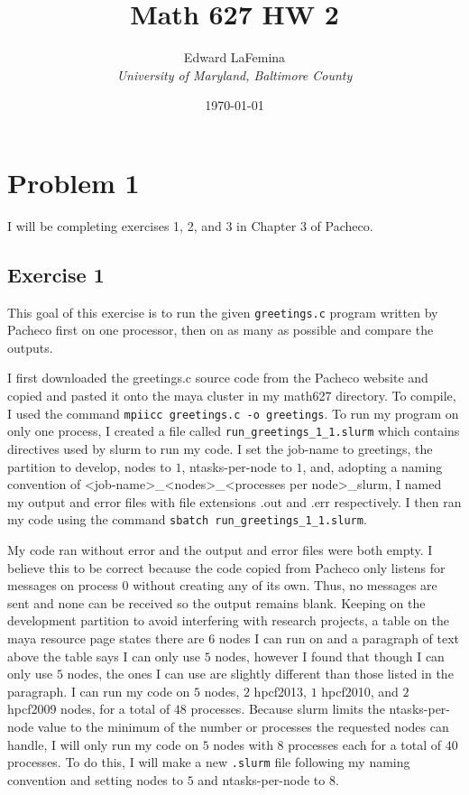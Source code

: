 \documentclass[11pt]{article}
\author{Edward LaFemina \\
		\it{University of Maryland, Baltimore County}}
\title{Math 627 HW 2}
\date{\today}
\begin{document}
\maketitle
\tableofcontents

\pagebreak
\section{Problem 1}
I will be completing exercises 1, 2, and 3 in Chapter 3 of Pacheco.
	\subsection{Exercise 1}
	This goal of this exercise is to run the given \texttt{greetings.c} program written by Pacheco first on one processor, then on as many as possible and compare the outputs.
	
	I first downloaded the greetings.c source code from the Pacheco website and copied and pasted it onto the maya cluster in my math627 directory. To compile, I used the command \texttt{mpiicc greetings.c -o greetings}. To run my program on only one process, I created a file called \texttt{run\_greetings\_1\_1.slurm} which contains directives used by slurm to run my code. I set the job-name to greetings, the partition to develop, nodes to $1$, ntasks-per-node to $1$, and, adopting a naming convention of \textless job-name\textgreater\_\textless nodes\textgreater\_\textless processes per node\textgreater\_slurm, I named my output and error files with file extensions .out and .err respectively. I then ran my code using the command \texttt{sbatch run\_greetings\_1\_1.slurm}.
	
	My code ran without error and the output and error files were both empty. I believe this to be correct because the code copied from Pacheco only listens for messages on process 0 without creating any of its own. Thus, no messages are sent and none can be received so the output remains blank. Keeping on the development partition to avoid interfering with research projects, a table on the maya resource page states there are 6 nodes I can run on and a paragraph of text above the table says I can only use $5$ nodes, however I found that though I can only use $5$ nodes, the ones I can use are slightly different than those listed in the paragraph. I can run my code on $5$ nodes, $2$ hpcf2013, $1$ hpcf2010, and $2$ hpcf2009 nodes, for a total of $48$ processes. Because slurm limits the ntasks-per-node value to the minimum of the number or processes the requested nodes can handle, I will only run my code on $5$ nodes with $8$ processes each for a total of $40$ processes. To do this, I will make a new \texttt{.slurm} file following my naming convention and setting nodes to $5$ and ntasks-per-node to $8$.
	
\end{document}
